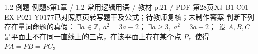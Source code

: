 \par\noindent\begin{minipage}{\linewidth}
\begin{bankitem}{1.2 例题 例题8}{第1章 / 1.2 常用逻辑用语 / 教材 p.21 / PDF 第28页}{XJ-B1-C01-EX-P021-Y0177}{已对照原页转写题干及公式；待教师复核；未制作答案}
判断下列存在量词命题的真假：
$\exists a\in\mathbb Z,\ a^2=3a-2$；
$\exists a\ge3,\ a^2=3a-2$；
设 $A,B,C$ 是平面上不在同一直线上的三点，在该平面上存在某个点 $P$，使得 $PA=PB=PC$。
\end{bankitem}
\end{minipage}\par\medskip
